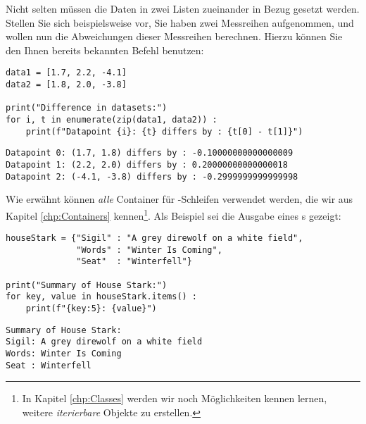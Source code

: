 \begin{hintbox}
Nicht selten müssen die Daten in zwei Listen zueinander in Bezug gesetzt werden. Stellen Sie sich beispielsweise vor, Sie haben zwei Messreihen aufgenommen, und wollen nun die Abweichungen dieser Messreihen berechnen. Hierzu können Sie den Ihnen bereits bekannten Befehl  benutzen:

\begin{codebox}
\begin{verbatim}
data1 = [1.7, 2.2, -4.1]
data2 = [1.8, 2.0, -3.8]

print("Difference in datasets:")
for i, t in enumerate(zip(data1, data2)) :
    print(f"Datapoint {i}: {t} differs by : {t[0] - t[1]}")
\end{verbatim}
\end{codebox}

\begin{cmdbox}
\begin{verbatim}
Datapoint 0: (1.7, 1.8) differs by : -0.10000000000000009
Datapoint 1: (2.2, 2.0) differs by : 0.20000000000000018
Datapoint 2: (-4.1, -3.8) differs by : -0.2999999999999998
\end{verbatim}
\end{cmdbox}
\end{hintbox}

Wie erwähnt können \emph{alle} Container für -Schleifen verwendet werden, die wir aus Kapitel \ref{chp:Containers} kennen\footnote{In Kapitel \ref{chp:Classes} werden wir noch Möglichkeiten kennen lernen, weitere \emph{iterierbare} Objekte zu erstellen.}. Als Beispiel sei die Ausgabe eines s gezeigt:
\begin{codebox}
\begin{verbatim}
houseStark = {"Sigil" : "A grey direwolf on a white field",
              "Words" : "Winter Is Coming",
              "Seat"  : "Winterfell"}

print("Summary of House Stark:")
for key, value in houseStark.items() :
    print(f"{key:5}: {value}")
\end{verbatim}
\end{codebox}

\begin{cmdbox}
\begin{verbatim}
Summary of House Stark:
Sigil: A grey direwolf on a white field
Words: Winter Is Coming
Seat : Winterfell
\end{verbatim}
\end{cmdbox}


